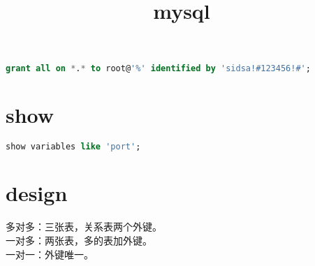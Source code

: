\documentclass[12pt,twiside,a4paper]{book}
\numberwithin{chapter}{part}
\begin{document}
\author
{
}

\title{mysql}
\maketitle
\tableofcontents %
\newpage
\pagestyle{fancy}

\section{}
\begin{lstlisting}[language=sql,breaklines = true]
grant all on *.* to root@'%' identified by 'sidsa!#123456!#';
\end{lstlisting}

\section{show}
\begin{lstlisting}[language=sql,breaklines = true]
show variables like 'port';
\end{lstlisting}
\section{design}
多对多：三张表，关系表两个外键。\\
一对多：两张表，多的表加外键。\\
一对一：外键唯一。
\end{document}
